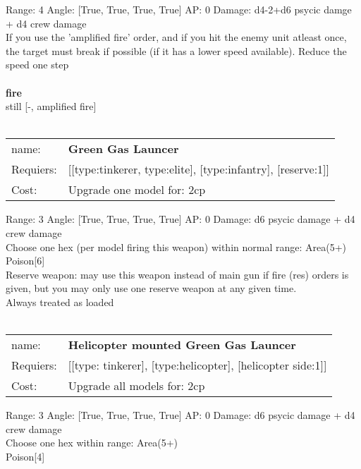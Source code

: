 Range: 4  Angle: [True, True, True, True] AP: 0 Damage: d4-2+d6 psycic damge + d4 crew damage \\
If you use the 'amplified fire' order, and if you hit the enemy unit atleast once, the target must break if possible (if it has a lower speed available). Reduce the speed one step\\ 







\ \\ {\bf fire } \\
still [-, amplified fire] \\

\ \\
\begin{tabular}{ll}
name: & {\bf Green Gas Launcer } \\
Requiers: & [[type:tinkerer, type:elite], [type:infantry], [reserve:1]] \\
Cost: & Upgrade one model for: 2cp \\
\end{tabular}



Range: 3  Angle: [True, True, True, True] AP: 0 Damage: d6 psycic damage + d4 crew damage \\
Choose one hex (per model firing this weapon) within normal range: Area(5+)\\ 
Poison[6]\\ 
Reserve weapon: may use this weapon instead of main gun if fire (res) orders is given, but you may only use one reserve weapon at any given time.\\ 
Always treated as loaded\\ 








\ \\
\begin{tabular}{ll}
name: & {\bf Helicopter mounted Green Gas Launcer } \\
Requiers: & [[type: tinkerer], [type:helicopter], [helicopter side:1]] \\
Cost: & Upgrade all models for: 2cp \\
\end{tabular}



Range: 3  Angle: [True, True, True, True] AP: 0 Damage: d6 psycic damage + d4 crew damage \\
Choose one hex within range: Area(5+)\\ 
Poison[4]\\ 








